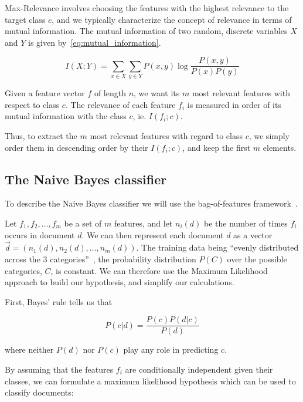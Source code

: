 Max-Relevance involves choosing the features with the highest relevance to the target class $c$, and we typically characterize the concept of relevance in terms of mutual information. The mutual information of two random, discrete variables $X$ and $Y$ is given by~\eqref{eq:mutual_information}.

\begin{equation}
  I(X; Y) = \sum_{x \in X} \sum_{y \in Y} P(x, y) \log \frac{P(x, y)}{P(x) P(y)}
  \label{eq:mutual_information}
\end{equation}

Given a feature vector $f$ of length $n$, we want its $m$ most relevant features with respect to class $c$. The relevance of each feature $f_i$ is measured in order of its mutual information with the class $c$, ie. $I(f_i; c)$.

Thus, to extract the $m$ most relevant features with regard to class $c$, we simply order them in descending order by their $I(f_i; c)$, and keep the first $m$ elements.


\subsection{The Naive Bayes classifier}
\label{ssec:nb_classifier}

To describe the Naive Bayes classifier we will use the bag-of-features framework~\cite{pang2002thumbs}.

Let ${f_1, f_2, \dotsc, f_m}$ be a set of $m$ features, and let $n_i(d)$ be the number of times $f_i$ occurs in document $d$. We can then represent each document $d$ as a vector $\vec{d} = (n_1(d), n_2(d), \dotsc, n_m(d))$. The training data being ``evenly distributed across the 3 categories''~\cite{DatumBoxTwitterSentiment}, the probability distribution $P(C)$ over the possible categories, $C$, is constant. We can therefore use the Maximum Likelihood approach to build our hypothesis, and simplify our calculations.

First, Bayes' rule tells us that

\begin{equation}
  P(c | d) = \frac{P(c) P(d | c)}{P(d)}
\end{equation}

where neither $P(d)$ nor $P(c)$ play any role in predicting $c$.

By assuming that the features $f_i$ are conditionally independent given their classes, we can formulate a maximum likelihood hypothesis which can be used to classify documents:

